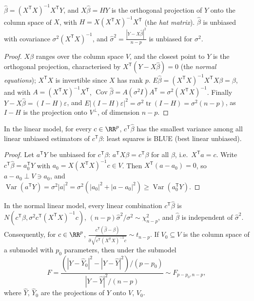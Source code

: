 \begin{proposition}\label{statistics:proposition-least-squares}
$\hat\beta = (X^{\mathsf T}X)^{-1}X^{\mathsf T}Y$, and $X\hat\beta = HY$ is the orthogonal projection of $Y$ onto the column space of $X$, with $H = X(X^{\mathsf T}X)^{-1}X^{\mathsf T}$ (the \emph{hat matrix}). $\hat\beta$ is unbiased with
covariance $\sigma^2(X^{\mathsf T}X)^{-1}$, and $\hat\sigma^2 = \frac{|Y - X\hat\beta|^2}{n - p}$ is unbiased for $\sigma^2$.
\end{proposition}

\begin{proof}
$X\beta$ ranges over the column space $V$, and the closest point to $Y$ is the orthogonal projection, characterised by $X^{\mathsf T}(Y - X\hat\beta) = 0$ (the \emph{normal equations}); $X^{\mathsf T}X$ is invertible since $X$ has rank $p$.
$E\hat\beta = (X^{\mathsf T}X)^{-1}X^{\mathsf T}X\beta = \beta$, and with $A = (X^{\mathsf T}X)^{-1}X^{\mathsf T}$, $\operatorname{Cov}\hat\beta = A(\sigma^2I)A^{\mathsf T} = \sigma^2(X^{\mathsf T}X)^{-1}$. Finally $Y - X\hat\beta = (I - H)\varepsilon$, and
$E|(I - H)\varepsilon|^2 = \sigma^2\operatorname{tr}(I - H) = \sigma^2(n - p)$, as $I - H$ is the projection onto $V^\perp$, of dimension $n - p$.
\end{proof}

\begin{theorem}\label{statistics:theorem-gauss-markov}
In the linear model, for every $c \in \RR^p$, $c^{\mathsf T}\hat\beta$ has the smallest variance among all linear unbiased estimators of $c^{\mathsf T}\beta$: least squares is BLUE (best linear unbiased).
\end{theorem}

\begin{proof}
Let $a^{\mathsf T}Y$ be unbiased for $c^{\mathsf T}\beta$: $a^{\mathsf T}X\beta = c^{\mathsf T}\beta$ for all $\beta$, i.e.\ $X^{\mathsf T}a = c$. Write $c^{\mathsf T}\hat\beta = a_0^{\mathsf T}Y$ with $a_0 = X(X^{\mathsf T}X)^{-1}c \in V$. Then $X^{\mathsf T}(a - a_0) = 0$, so
$a - a_0 \perp V \ni a_0$, and $\operatorname{Var}(a^{\mathsf T}Y) = \sigma^2|a|^2 = \sigma^2(|a_0|^2 + |a - a_0|^2) \geq \operatorname{Var}(a_0^{\mathsf T}Y)$.
\end{proof}

\begin{theorem}\label{statistics:theorem-normal-linear-model}
In the normal linear model, every linear combination $c^{\mathsf T}\hat\beta$ is $N(c^{\mathsf T}\beta, \sigma^2c^{\mathsf T}(X^{\mathsf T}X)^{-1}c)$, $(n - p)\hat\sigma^2/\sigma^2 \sim \chi^2_{n-p}$, and $\hat\beta$ is independent of
$\hat\sigma^2$. Consequently, for
$c \in \RR^p$, $\frac{c^{\mathsf T}(\hat\beta - \beta)}{\hat\sigma\sqrt{c^{\mathsf T}(X^{\mathsf T}X)^{-1}c}} \sim t_{n-p}$. If $V_0 \subseteq V$ is the column space of a submodel with $p_0$ parameters, then under the submodel
\[
F = \frac{(|Y - \hat Y_0|^2 - |Y - \hat Y|^2)/(p - p_0)}{|Y - \hat Y|^2/(n - p)} \sim F_{p - p_0, n - p},
\]
where $\hat Y$, $\hat Y_0$ are the projections of $Y$ onto $V$, $V_0$.
\end{theorem}

